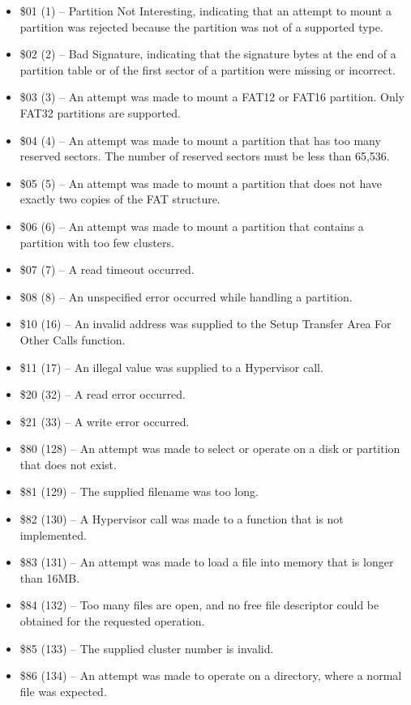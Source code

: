\begin{itemize}
\item \$01 (1) -- Partition Not Interesting, indicating that an attempt to mount a partition was rejected because the partition was not of a supported type.
\item \$02 (2) -- Bad Signature, indicating that the signature bytes at the end of a partition table or of the first sector of a partition were missing or incorrect.
\item \$03 (3) -- An attempt was made to mount a FAT12 or FAT16 partition.  Only FAT32 partitions are supported.
\item \$04 (4) -- An attempt was made to mount a partition that has too many reserved sectors. The number of reserved sectors must be less than 65,536.
  \item \$05 (5) -- An attempt was made to mount a partition that does not have exactly two copies of the FAT structure.
\item \$06 (6) -- An attempt was made to mount a partition that contains a partition with too few clusters.
\item \$07 (7) -- A read timeout occurred.
  \item \$08 (8) -- An unspecified error occurred while handling a partition.
\item \$10 (16) -- An invalid address was supplied to the Setup Transfer Area For Other Calls function.
\item \$11 (17) -- An illegal value was supplied to a Hypervisor call.
\item \$20 (32) -- A read error occurred.
\item \$21 (33) -- A write error occurred.
\item \$80 (128) -- An attempt was made to select or operate on a disk or partition that does not exist.
\item \$81 (129) -- The supplied filename was too long.
\item \$82 (130) -- A Hypervisor call was made to a function that is not implemented. 
\item \$83 (131) -- An attempt was made to load a file into memory that is longer than 16MB.
\item \$84 (132) -- Too many files are open, and no free file descriptor could be obtained for the requested operation.
\item \$85 (133) -- The supplied cluster number is invalid.
\item \$86 (134) -- An attempt was made to operate on a directory, where a normal file was expected.

\end{itemize}
